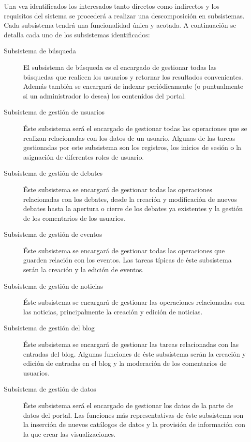 Una vez identificados los interesados tanto directos como indirectos y los requisitos del sistema se procederá a realizar una descomposición en subsistemas.  Cada subsistema tendrá una funcionalidad única y acotada.\newline
A continuación se detalla cada uno de los subsistemas identificados:

\begin{description}
\item[Subsistema de búsqueda]  El subsistema de búsqueda es el encargado de gestionar todas las búsquedas que realicen los usuarios y retornar los resultados convenientes.  Además también se encargará de indexar periódicamente (o puntualmente si un administrador lo desea) los contenidos del portal.
\item[Subsistema de gestión de usuarios]  Éste subsistema será el encargado de gestionar todas las operaciones que se realizan relacionadas con los datos de un usuario.  Algunas de las tareas gestionadas por este subsistema son los registros, los inicios de sesión o la asignación de diferentes roles de usuario.
\item[Subsistema de gestión de debates]  Éste subsistema se encargará de gestionar todas las operaciones relacionadas con los debates, desde la creación y modificación de nuevos debates hasta la apertura o cierre de los debates ya existentes y la gestión de los comentarios de los usuarios.
\item[Subsistema de gestión de eventos]  Éste subsistema se encargará de gestionar todas las operaciones que guarden relación con los eventos.  Las tareas típicas de éste subsistema serán la creación y la edición de eventos.
\item[Subsistema de gestión de noticias]  Éste subsistema se encargará de gestionar las operaciones relacionadas con las noticias, principalmente la creación y edición de noticias.
\item[Subsistema de gestión del blog]  Éste subsistema se encargará de gestionar las tareas relacionadas con las entradas del blog.  Algunas funciones de éste subsistema serán la creación y edición de entradas en el blog y la moderación de los comentarios de usuarios.
\item[Subsistema de gestión de datos]  Éste subsistema será el encargado de gestionar los datos de la parte de datos del portal.  Las funciones más representativas de éste subsistema son la inserción de nuevos catálogos de datos y la provisión de información con la que crear las visualizaciones.
\end{description}

